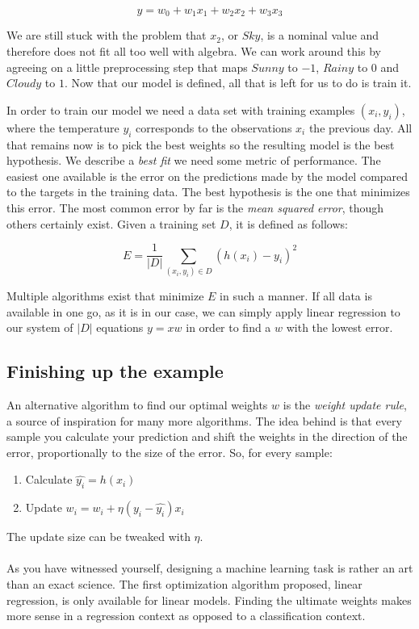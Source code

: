 $$ y = w_0 + w_1x_1 + w_2x_2 + w_3x_3 $$

We are still stuck with the problem that $x_2$, or $Sky$,
is a nominal value and therefore does not fit all too well with algebra.
We can work around this by agreeing on
a little preprocessing step
that maps $Sunny$ to $-1$, $Rainy$ to $0$ and $Cloudy$ to $1$.
Now that our model is defined, all that is left for us to do
is train it.

In order to train our model we need a data set with training examples
$(x_i, y_i)$,
where the temperature $y_i$ corresponds to
the observations $x_i$ the previous day.
All that remains now is to pick the best weights
so the resulting model is the best hypothesis.
We describe a \textit{best fit}
we need some metric of performance.
The easiest one available is the error on the predictions made by the model
compared to the targets in the training data.
The best hypothesis is the one that minimizes this error.
The most common error by far is the \textit{mean squared error},
though others certainly exist.
Given a training set $D$, it is defined as follows:

$$ E = \frac{1}{|D|} \sum_{(x_i, y_i) \in D}{(h(x_i) - y_i)^2} $$

Multiple algorithms exist that minimize $E$ in such a manner.
If all data is available in one go, as it is in our case,
we can simply apply linear regression to our system
of $|D|$ equations $y = xw$ in order to find a $w$
with the lowest error.

\subsection{Finishing up the example}
An alternative algorithm to find our optimal weights $w$
is the \textit{weight update rule},
a source of inspiration for many more algorithms.
The idea behind is that every sample
you calculate your prediction
and shift the weights in the direction of the error,
proportionally to the size of the error.
So, for every sample:
\begin{enumerate}
\item Calculate $\hat{y_i} = h(x_i)$
\item Update $w_i = w_i + \eta(y_i - \hat{y_i})x_i$
\end{enumerate}

The update size can be tweaked with $\eta$.

\paragraph{}
As you have witnessed yourself,
designing a machine learning task
is rather an art than an exact science.
The first optimization algorithm proposed,
linear regression,
is only available for linear models.
Finding the ultimate weights
makes more sense in a regression context
as opposed to a classification context.

